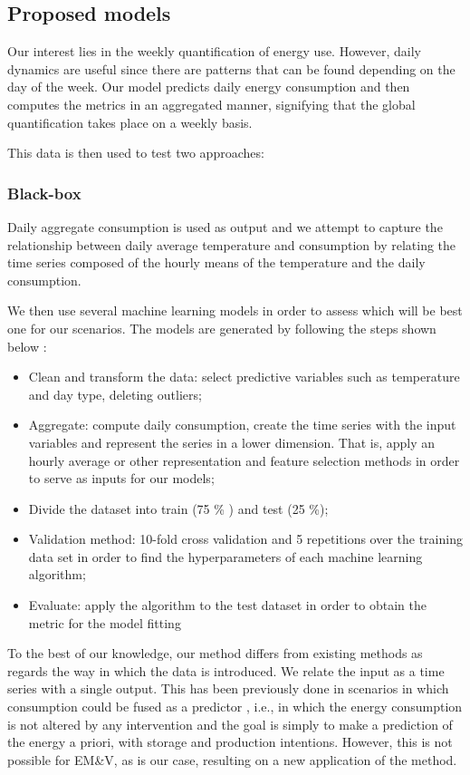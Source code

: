\documentclass[10pt, conference, compsocconf]{IEEEtran}
\begin{document}
\subsection{Proposed models}

Our interest lies in the weekly quantification of energy use. However, daily dynamics are useful since there are patterns that can be found depending on the day of the week. Our model predicts daily energy consumption and then computes the metrics in an aggregated manner, signifying that the global quantification takes place on a weekly basis.

This data is then used to test two approaches:

\subsubsection{Black-box}

Daily aggregate consumption is used as output and we attempt to capture the relationship between daily average temperature and consumption by relating the time series composed of the hourly means of the temperature and the daily consumption.

We then use several machine learning models in order to assess which will be best one for our scenarios. The models are generated by following the steps shown below \cite{gonzalez2016towards}:

\begin{itemize}
\item Clean and transform the data: select predictive variables such as temperature and day type, deleting outliers; 
\item Aggregate: compute daily consumption, create the time series with the input variables and represent the series in a lower dimension. That is, apply an hourly average or other representation and feature selection methods in order to serve as inputs for our models;
\item Divide the dataset into train (75 \% ) and test (25 \%);
\item Validation method: 10-fold cross validation and 5 repetitions over the training data set in order to find the hyperparameters of each machine learning algorithm;
\item Evaluate: apply the algorithm to the test dataset in order to obtain the metric for the model fitting
\end{itemize}


To the best of our knowledge, our method differs from existing methods as regards the way in which the data is introduced. We relate the input as a time series with a single output. This has been previously done in scenarios in which consumption could be fused as a predictor \cite{ruijin2013building}, i.e., in which the energy consumption is not altered by any intervention and the goal is simply to make a prediction of the energy a priori, with storage and production intentions. However, this is not possible for EM\&V, as is our case, resulting on a new application of the method.
\end{document}
